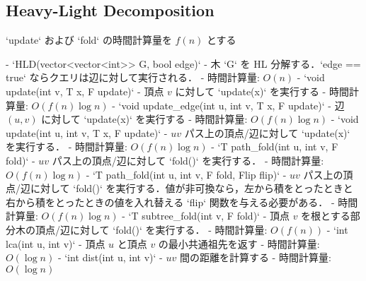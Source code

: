 \subsection{Heavy-Light Decomposition}

\begin{small}
\begin{markdown}
`update` および `fold` の時間計算量を $f(n)$ とする

- `HLD(vector<vector<int>> G, bool edge)`
    - 木 `G` を HL 分解する．`edge == true` ならクエリは辺に対して実行される．
    - 時間計算量: $O(n)$
- `void update(int v, T x, F update)`
    - 頂点 $v$ に対して `update(x)` を実行する
    - 時間計算量: $O(f(n) \log n)$
- `void update\_edge(int u, int v, T x, F update)`
    - 辺 $(u, v)$ に対して `update(x)` を実行する
    - 時間計算量: $O(f(n) \log n)$
- `void update(int u, int v, T x, F update)`
    - $uv$ パス上の頂点/辺に対して `update(x)` を実行する．
    - 時間計算量: $O(f(n) \log n)$
- `T path\_fold(int u, int v, F fold)`
    - $uv$ パス上の頂点/辺に対して `fold()` を実行する．
    - 時間計算量: $O(f(n) \log n)$
- `T path\_fold(int u, int v, F fold, Flip flip)`
    - $uv$ パス上の頂点/辺に対して `fold()` を実行する．値が非可換なら，左から積をとったときと右から積をとったときの値を入れ替える `flip` 関数を与える必要がある．
    - 時間計算量: $O(f(n) \log n)$
- `T subtree\_fold(int v, F fold)`
    - 頂点 $v$ を根とする部分木の頂点/辺に対して `fold()` を実行する．
    - 時間計算量: $O(f(n))$
- `int lca(int u, int v)`
    - 頂点 $u$ と頂点 $v$ の最小共通祖先を返す
    - 時間計算量: $O(\log n)$
- `int dist(int u, int v)`
    - $uv$ 間の距離を計算する
    - 時間計算量: $O(\log n)$

\end{markdown}
\end{small}

